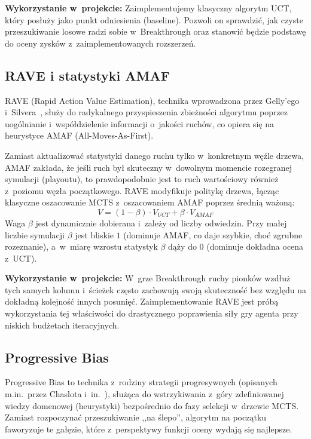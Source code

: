 \documentclass[12pt,a4paper]{article}
\begin{document}
\textbf{Wykorzystanie w~projekcie:} Zaimplementujemy klasyczny algorytm UCT, który posłuży jako punkt odniesienia (baseline). Pozwoli on sprawdzić, jak czyste przeszukiwanie losowe radzi sobie w~Breakthrough oraz stanowić będzie podstawę do oceny zysków z~zaimplementowanych rozszerzeń.

\subsection{RAVE i statystyki AMAF}

RAVE (Rapid Action Value Estimation), technika wprowadzona przez Gelly'ego i~Silvera~\cite{gelly2011monte}, służy do radykalnego przyspieszenia zbieżności algorytmu poprzez uogólnianie i~współdzielenie informacji o~jakości ruchów, co opiera się na heurystyce AMAF (All-Moves-As-First).

Zamiast aktualizować statystyki danego ruchu tylko w~konkretnym węźle drzewa, AMAF zakłada, że jeśli ruch był skuteczny w~dowolnym momencie rozegranej symulacji (playoutu), to prawdopodobnie jest to ruch wartościowy również z~poziomu węzła początkowego. RAVE modyfikuje politykę drzewa, łącząc klasyczne oszacowanie MCTS z~oszacowaniem AMAF poprzez średnią ważoną:
$$ V = (1 - \beta) \cdot V_{UCT} + \beta \cdot V_{AMAF} $$
Waga $\beta$ jest dynamicznie dobierana i~zależy od liczby odwiedzin. Przy małej liczbie symulacji $\beta$ jest bliskie $1$ (dominuje AMAF, co daje szybkie, choć zgrubne rozeznanie), a~w~miarę wzrostu statystyk $\beta$ dąży do $0$ (dominuje dokładna ocena z~UCT).

\textbf{Wykorzystanie w~projekcie:} W~grze Breakthrough ruchy pionków wzdłuż tych samych kolumn i~ścieżek często zachowują swoją skuteczność bez względu na dokładną kolejność innych posunięć. Zaimplementowanie RAVE jest próbą wykorzystania tej właściwości do drastycznego poprawienia siły gry agenta przy niskich budżetach iteracyjnych.

\subsection{Progressive Bias}

Progressive Bias to technika z~rodziny strategii progresywnych (opisanych m.in.\ przez Chaslota i~in.~\cite{chaslot2008progressive}), służąca do wstrzykiwania z~góry zdefiniowanej wiedzy domenowej (heurystyki) bezpośrednio do fazy selekcji w~drzewie MCTS. Zamiast rozpoczynać przeszukiwanie ,,na ślepo'', algorytm na początku faworyzuje te gałęzie, które z~perspektywy funkcji oceny wydają się najlepsze.
\end{document}

